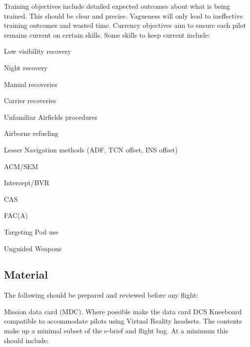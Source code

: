 Training objectives include detailed expected outcomes about what is being
trained. This should be clear and precise. Vagueness will only lead to
ineffective training outcomes and wasted time. Currency objectives aim to
ensure each pilot remains current on certain skills. Some skills to keep
current include:

\begin{subsectionenumerate}
  \item Low visibility recovery
  \item Night recovery
  \item Manual recoveries
  \item Carrier recoveries
  \item Unfamiliar Airfields procedures
  \item Airborne refueling
  \item Lesser Navigation methods (ADF, TCN offset, INS offset)
  \item ACM/SEM
  \item Intercept/BVR
  \item CAS
  \item FAC(A)
  \item Targeting Pod use
  \item Unguided Weapons
\end{subsectionenumerate}

\subsection{Material}

The following should be prepared and reviewed before any flight:

Mission data card (MDC). Where possible make the data card DCS Kneeboard
compatible to accommodate pilots using Virtual Reality headsets. The contents
make up a minimal subset of the e-brief and flight bag. At a minimum this
should include:

